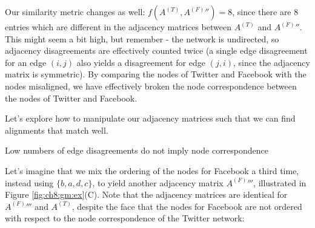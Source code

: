 Our similarity metric changes as well: $f\left(A^{(T)}, A^{(F)}''\right) = 8$, since there are $8$ entries which are different in the adjacency matrices between $A^{(T)}$ and $A^{(F)}''$. This might seem a bit high, but remember - the network is undirected, so adjacency disagreements are effectively counted twice (a single edge disagreement for an edge $(i,j)$ also yields a disagreement for edge $(j, i)$, since the adjacency matrix is symmetric). By comparing the nodes of Twitter and Facebook with the nodes misaligned, we have effectively broken the node correspondence between the nodes of Twitter and Facebook. 

Let's explore how to manipulate our adjacency matrices such that we can find alignments that match well.

\begin{floatingbox}[h]\caption{Low numbers of edge disagreements do not imply node correspondence}

Let's imagine that we mix the ordering of the nodes for Facebook a third time, instead using $\{b, a, d, c\}$, to yield another adjacency matrix $A^{(F)}'''$, illustrated in Figure \ref{fig:ch8:gm:ex}(C). Note that the adjacency matrices are identical for $A^{(F)}'''$ and $A^{(T)}$, despite the face that the nodes for Facebook are not ordered with respect to the node correspondence of the Twitter network:


\end{floatingbox}
